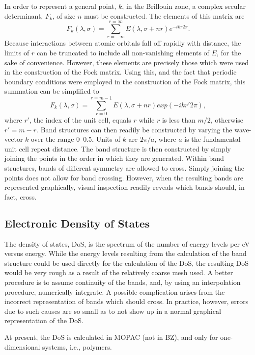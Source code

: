 In order to represent a general point, $k$, in the Brillouin  zone, a complex
secular determinant, $F_{k}$, of size $n$ must be  constructed.  The elements
of this matrix are
$$
 F_{k}(\lambda,\sigma) = \sum_{r=-\infty}^{r=
\infty}E(\lambda,\sigma+nr)e^{-ikr2\pi}.
$$
Because interactions between atomic orbitals fall off  rapidly with distance,
the limits of $r$ can be  truncated to include all non-vanishing elements of
$E$, for the sake of convenience. However,  these elements are precisely those
which were used in the  construction of the Fock matrix.  Using this, and the
fact that  periodic boundary conditions were employed in the construction of
the Fock matrix, this summation can be simplified to
$$
 F_{k}(\lambda,\sigma) = \sum_{r=0}^{r=m-1}E(\lambda,\sigma+nr)exp(-ikr'2\pi),
$$
where $r'$, the index of the unit cell, equals $r$ while $r$ is less  than
$m/2$, otherwise $r' = m-r$.  Band structures can then readily be constructed
by varying  the wave-vector $k$ over the range 0--0.5.  Units of $k$ are
$2\pi/a$,  where $a$ is the fundamental unit cell repeat distance.  The band
structure is then constructed by simply joining the points in the
 order in which they are generated.
Within band structures, bands  of different symmetry are allowed to cross.
Simply joining the  points does not allow for band crossing.  However, when
the  resulting bands are represented graphically, visual inspection  readily
reveals which bands should, in fact, cross.

\subsection{Electronic Density of States}
The density of states, DoS, is the spectrum of the number of  energy levels per
eV versus energy.  While the energy levels  resulting from the calculation of
the band structure could be  used directly for the calculation of the DoS, the
resulting DoS  would be very rough as a result of the relatively coarse mesh
used.  A better procedure is to assume continuity of the bands, and, by using
an interpolation procedure, numerically integrate.   A possible complication
arises from the incorrect representation  of bands which should cross.  In
practice, however, errors due to  such causes are so small as to not show up in
a normal graphical  representation of the DoS.

At present, the DoS is calculated in MOPAC (not in BZ), and only
for one-dimensional systems, i.e., polymers.

